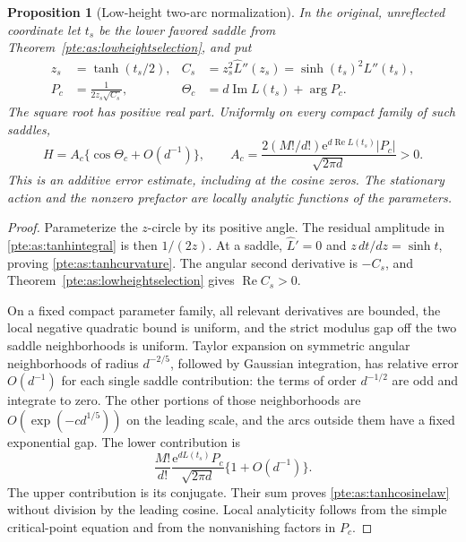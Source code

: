 \documentclass[11pt,a4paper]{article}
\numberwithin{equation}{section}
\newtheorem{proposition}[theorem]{Proposition}
\theoremstyle{definition}
\theoremstyle{plain}
\newcommand{\ee}{\mathrm e}
\begin{document}
\begin{proposition}[Low-height two-arc normalization]\label{pte:as:tanhcosine}
In the original, unreflected coordinate let $t_s$ be the lower favored
saddle from Theorem~\ref{pte:as:lowheightselection}, and put
\begin{align}
 z_s&=\tanh(t_s/2),&
 C_s&=z_s^2\widehat L''(z_s)
       =\sinh(t_s)^2L''(t_s),\label{pte:as:tanhcurvature}\\
 P_c&=\frac1{2z_s\sqrt{C_s}},&
 \Theta_c&=d\operatorname{Im}L(t_s)+\arg P_c.
\end{align}
The square root has positive real part.  Uniformly on every compact
family of such saddles,
\begin{equation}\label{pte:as:tanhcosinelaw}
 H=A_c\{\cos\Theta_c+O(d^{-1})\},\qquad
 A_c=\frac{2(M!/d!)\ee^{d\operatorname{Re}L(t_s)}|P_c|}
               {\sqrt{2\pi d}}>0.
\end{equation}
This is an additive error estimate, including at the cosine zeros.
The stationary action and the nonzero prefactor are locally analytic
functions of the parameters.
\end{proposition}
\begin{proof}
Parameterize the $z$-circle by its positive angle.  The residual
amplitude in \eqref{pte:as:tanhintegral} is then $1/(2z)$.  At a saddle,
$\widehat L'=0$ and $z\,dt/dz=\sinh t$, proving
\eqref{pte:as:tanhcurvature}.  The angular second derivative is $-C_s$, and
Theorem~\ref{pte:as:lowheightselection} gives $\operatorname{Re}C_s>0$.

On a fixed compact parameter family, all relevant derivatives are
bounded, the local negative quadratic bound is uniform, and the strict
modulus gap off the two saddle neighborhoods is uniform.  Taylor
expansion on symmetric angular neighborhoods of radius $d^{-2/5}$,
followed by Gaussian integration, has relative error $O(d^{-1})$ for
each single saddle contribution: the terms of order $d^{-1/2}$ are odd
and integrate to zero.  The other portions of those neighborhoods are
$O(\exp(-c d^{1/5}))$ on the leading scale, and the arcs outside them
have a fixed exponential gap.  The lower contribution is
\[
 \frac{M!}{d!}\frac{\ee^{dL(t_s)}P_c}{\sqrt{2\pi d}}
       \{1+O(d^{-1})\}.
\]
The upper contribution is its conjugate.  Their sum proves
\eqref{pte:as:tanhcosinelaw} without division by the leading cosine.
Local analyticity follows from the simple critical-point equation and
from the nonvanishing factors in $P_c$.
\end{proof}
\end{document}
